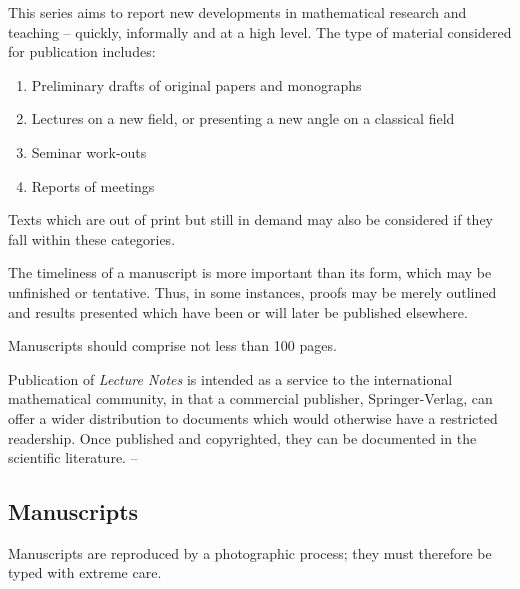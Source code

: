 This series aims to report new developments in mathematical research and teaching -- quickly, informally
and at a high level. The type of material considered for publication includes:
\begin{enumerate}
\item Preliminary drafts of original papers and monographs
\item Lectures on a new field, or presenting a new angle on a classical field
\item Seminar work-outs
\item Reports of meetings
\end{enumerate}
Texts which are out of print but still in demand may also be considered if they fall within these categories.

The timeliness of a manuscript is more important than its form, which may be unfinished or tentative.
Thus, in some instances, proofs may be merely outlined and results presented which have been or will
later be published elsewhere.

Manuscripts should comprise not less than 100 pages.

Publication of \textit{Lecture Notes} is intended as a service to the international mathematical community, in
that a commercial publisher, Springer-Verlag, can offer a wider distribution to documents which would
otherwise have a restricted readership. Once published and copyrighted, they can be documented in the
scientific literature. --

\subsection*{Manuscripts}
Manuscripts are reproduced by a photographic process; they must therefore be typed with extreme care.
